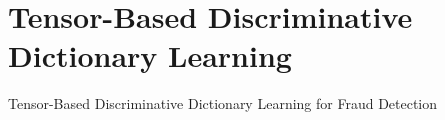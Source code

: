 \chapter{Tensor-Based Discriminative Dictionary Learning}
\label{ch:tensor_dl}

Tensor-Based Discriminative Dictionary Learning for Fraud Detection